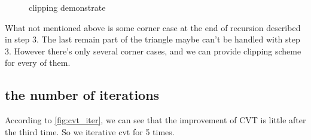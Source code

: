 \documentclass[3p]{elsarticle}
\begin{document}
\begin{figure}
  \hfill
  \hfill
  \par
  \caption{clipping demonstrate}
  \label{fig:clip_demonstrate}
\end{figure}

What not mentioned above is some corner case at the end of recursion described in step 3. The last remain part of the triangle maybe can't be handled with step 3. However there's only several corner cases, and we can provide clipping scheme for every of them.

\subsection{the number of iterations}
According to \ref{fig:cvt_iter}, we can see that the improvement of CVT is little after the third time. So we iterative cvt for 5 times.
\end{document}
